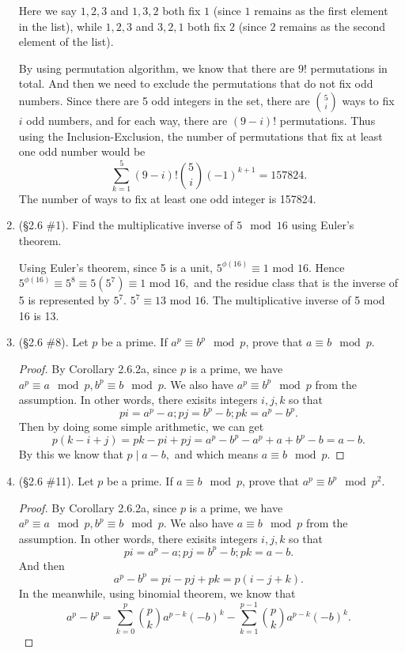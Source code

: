 \documentclass[11pt,a4paper]{article}
\begin{document}
\begin{enumerate}
	Here we say \(1,2,3\) and \(1,3,2\) both fix \(1\) (since \(1\) remains as the first element in the list), while \(1,2,3\) and \(3,2,1\) both fix \(2\) (since \(2\) remains as the second element of the list).

	By using permutation algorithm, we know that there are $9!$ permutations in total. And then we need to exclude the permutations that do not fix odd numbers. Since there are 5 odd integers in the set, there are $5 \choose i$ ways to fix $i$ odd numbers, and for each way, there are $(9-i)!$ permutations. Thus using the Inclusion-Exclusion, the number of permutations that fix at least one odd number would be \[\sum_{k=1}^{5} (9-i)! {5 \choose i} (-1)^{k+1} = 157824.\]
	The number of ways to fix at least one odd integer is 157824.

	\item (\S 2.6 \#1). Find the multiplicative inverse of \(5 \mod 16\) using Euler's theorem.

	Using Euler's theorem, since 5 is a unit, $5^{\phi(16)} \equiv 1$ mod $16.$ Hence $5^{\phi(16)} \equiv 5^8 \equiv 5(5^7) \equiv 1$ mod $16,$ and the residue class that is the inverse of 5 is represented by $5^7.$ $5^7 \equiv 13$ mod $16.$ The multiplicative inverse of 5 mod 16 is 13.

	\item (\S 2.6 \#8). Let \(p\) be a prime.  If \(a^{p} \equiv b^{p} \mod p \), prove that \(a \equiv b \mod p\).

	\begin{proof}
		By Corollary 2.6.2a, since $p$ is a prime, we have \(a^{p} \equiv a \mod p, b^{p} \equiv b \mod p.\) We also have \(a^{p} \equiv b^{p} \mod p \) from the assumption. In other words, there exisits integers $i, j, k$ so that \[pi=a^p-a; pj=b^p-b; pk=a^p-b^p.\] Then by doing some simple arithmetic, we can get \[p(k-i+j) = pk-pi+pj = a^p-b^p-a^p+a+b^p-b = a-b.\] By this we know that $p \mid a-b,$ and which means $a \equiv b \mod p.$
	\end{proof}

	\item (\S 2.6 \#11). Let \(p\) be a prime. If \(a \equiv b \mod p\), prove that \(a^{p} \equiv b^{p} \mod p^{2}\).

	\begin{proof}
		By Corollary 2.6.2a, since $p$ is a prime, we have \(a^{p} \equiv a \mod p, b^{p} \equiv b \mod p.\) We also have \(a \equiv b \mod p \) from the assumption. In other words, there exisits integers $i, j, k$ so that \[pi=a^p-a; pj=b^p-b; pk=a-b.\] And then \[a^p-b^p = pi-pj+pk = p(i-j+k).\] In the meanwhile, using binomial theorem, we know that \[a^p-b^p = \sum_{k=0}^{p}{p \choose k}a^{p-k}(-b)^{k} - \sum_{k=1}^{p-1}{p \choose k}a^{p-k}(-b)^{k}.\]


\end{proof}
\end{enumerate}
\end{document}
